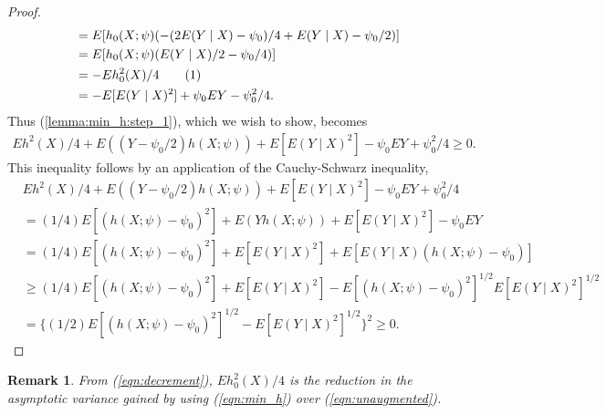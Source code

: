 \message{ !name(manuscript.tex)}\documentclass[10pt,a4paper]{amsart}
\newtheorem*{remark}{Remark}
\newcommand{\EE}{E}
\begin{document}
\begin{proof}
\begin{align*}
  &= \EE[h_0(X;\psi)(-(2\EE(Y\mid X)-\psi_0)/4 + E(Y\mid X) - \psi_0/2)]\\
  &= \EE[h_0(X;\psi)(E(Y\mid X)/2 - \psi_0/4)]\\
  &= -\EE h_0^2(X)/4 \addtocounter{equation}{1}\tag{\theequation}\label{eqn:decrement}\\
  &= -\EE[\EE(Y\mid X)^2] + \psi_0\EE Y - \psi_0^2/4.
\end{align*}
Thus (\ref{lemma:min_h:step_1}), which we wish to show, becomes
\begin{align*}
  \EE h^2(X)/4 + \EE((Y-\psi_0/2)h(X;\psi)) + \EE[\EE(Y\mid X)^2] - \psi_0\EE Y + \psi_0^2/4 \ge 0.
\end{align*}
This inequality follows by an application of the Cauchy-Schwarz inequality,
\begin{align*}
  &\EE h^2(X)/4 + \EE((Y-\psi_0/2)h(X;\psi)) + \EE[\EE(Y\mid X)^2] - \psi_0\EE Y + \psi_0^2/4 \\
  &= (1/4)\EE[(h(X;\psi)-\psi_0)^2] + \EE(Yh(X;\psi)) + \EE[\EE(Y\mid X)^2] - \psi_0\EE Y\\
  &= (1/4)\EE[(h(X;\psi)-\psi_0)^2] + \EE[\EE(Y\mid X)^2] + \EE[\EE(Y\mid X)(h(X;\psi)-\psi_0)]\\
  &\ge (1/4)\EE[(h(X;\psi)-\psi_0)^2] + \EE[\EE(Y\mid X)^2] - \EE[(h(X;\psi)-\psi_0)^2]^{1/2}\EE[\EE(Y\mid X)^2]^{1/2}\\
  &= \{(1/2)\EE[(h(X;\psi)-\psi_0)^2]^{1/2} - \EE[\EE(Y\mid X)^2]^{1/2} \}^2 \ge 0.
\end{align*}
\end{proof}

\begin{remark}
From (\ref{eqn:decrement}), $\EE h_0^2(X)/4$ is the reduction in the
asymptotic variance gained by
using (\ref{eqn:min_h}) over (\ref{eqn:unaugmented}).
\end{remark}

\end{document}
